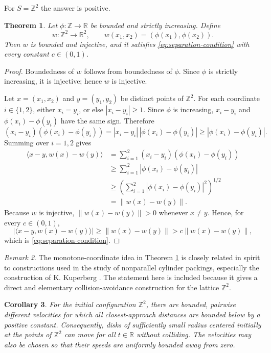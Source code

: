 \documentclass[11pt]{article}
\newtheorem{theorem}{Theorem}[section]
\newtheorem{corollary}[theorem]{Corollary}
\theoremstyle{remark}
\newtheorem{remark}[theorem]{Remark}
\begin{document}
For $S=\mathbb Z^2$ the answer is positive.

\begin{theorem}\label{thm:lattice}
Let $\phi:\mathbb Z\to\mathbb R$ be bounded and strictly increasing. Define
\[
w:\mathbb Z^2\to\mathbb R^2, \qquad
w(x_1,x_2)=(\phi(x_1),\phi(x_2)).
\]
Then $w$ is bounded and injective, and it satisfies \eqref{eq:separation-condition} with every constant $c\in(0,1)$.
\end{theorem}

\begin{proof}
Boundedness of $w$ follows from boundedness of $\phi$. Since $\phi$ is strictly increasing, it is injective; hence $w$ is injective.

Let $x=(x_1,x_2)$ and $y=(y_1,y_2)$ be distinct points of $\mathbb Z^2$. For each coordinate $i\in\{1,2\}$, either $x_i=y_i$, or else $|x_i-y_i|\ge 1$. Since $\phi$ is increasing, $x_i-y_i$ and $\phi(x_i)-\phi(y_i)$ have the same sign. Therefore
\[
(x_i-y_i)(\phi(x_i)-\phi(y_i))
=|x_i-y_i|\,|\phi(x_i)-\phi(y_i)|
\ge |\phi(x_i)-\phi(y_i)|.
\]
Summing over $i=1,2$ gives
\begin{align*}
\langle x-y,w(x)-w(y)\rangle
&=\sum_{i=1}^2 (x_i-y_i)(\phi(x_i)-\phi(y_i)) \\
&\ge \sum_{i=1}^2 |\phi(x_i)-\phi(y_i)| \\
&\ge \left(\sum_{i=1}^2 |\phi(x_i)-\phi(y_i)|^2\right)^{1/2} \\
&=\|w(x)-w(y)\|.
\end{align*}
Because $w$ is injective, $\|w(x)-w(y)\|>0$ whenever $x\ne y$. Hence, for every $c\in(0,1)$,
\[
\bigl|\langle x-y,w(x)-w(y)\rangle\bigr|
\ge \|w(x)-w(y)\|
> c\|w(x)-w(y)\|,
\]
which is \eqref{eq:separation-condition}.
\end{proof}

\begin{remark}
The monotone-coordinate idea in Theorem \ref{thm:lattice} is closely related in spirit to constructions used in the study of nonparallel cylinder packings, especially the construction of K. Kuperberg \cite{KuperbergNonparallel}. The statement here is included because it gives a direct and elementary collision-avoidance construction for the lattice $\mathbb Z^2$.
\end{remark}

\begin{corollary}\label{cor:lattice-billiards}
For the initial configuration $\mathbb Z^2$, there are bounded, pairwise different velocities for which all closest-approach distances are bounded below by a positive constant. Consequently, disks of sufficiently small radius centered initially at the points of $\mathbb Z^2$ can move for all $t\in\mathbb R$ without colliding. The velocities may also be chosen so that their speeds are uniformly bounded away from zero.
\end{corollary}
\end{document}
